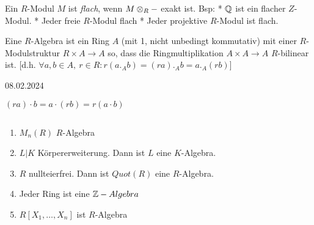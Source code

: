 \documentclass[../main.tex]{subfiles}
\begin{document}
Ein $R$-Modul $M$ ist \emph{flach}, wenn $M\otimes_R -$ exakt ist.
Bsp: * $\mathbb{Q}$ ist ein flacher $Z$-Modul.
* Jeder freie $R$-Modul flach
* Jeder projektive $R$-Modul ist flach.

\begin{definition}
    Eine $R$-Algebra ist ein Ring $A$ (mit 1, nicht unbedingt kommutativ) mit einer $R$-Modulstruktur $R\times A \rightarrow A$ so, dass die Ringmultiplikation $A\times A\rightarrow A$ $R$-bilinear ist.
    [d.h. $\forall a,b\in A,\ r\in R: r(a._Ab) = (ra)._A b = a._A(rb)$]
\end{definition}
\begin{flushright}
    08.02.2024
\end{flushright}
\begin{minipage}{0.3\textwidth}
    $(ra)\cdot b = a\cdot (rb) = r(a\cdot b)$
\end{minipage}
\begin{example}$ $
    \begin{enumerate}[label=(\roman*)]
        \item $M_n (R)$ $R$-Algebra
        \item $L|K$ Körpererweiterung. Dann ist $L$ eine $K$-Algebra.
        \item $R$ nullteierfrei. Dann ist $Quot(R)$ eine $R$-Algebra.
        \item Jeder Ring ist eine $\mathbb{Z}-Algebra$
        \item $R[X_1,\dots,X_n]$ ist $R$-Algebra
    \end{enumerate}
\end{example}
\end{document}
